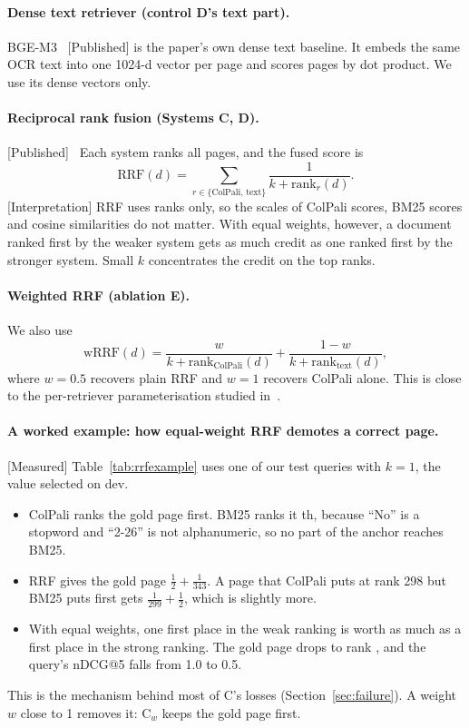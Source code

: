 \documentclass[11pt,a4paper]{article}
\newcommand{\lbl}[2]{\textsf{\scriptsize\textcolor{#1}{[#2]}}}
\newcommand{\Pub}{\lbl{tagP}{Published}}
\newcommand{\Int}{\lbl{tagI}{Interpretation}}
\newcommand{\Mea}{\lbl{tagM}{Measured}}
\begin{document}
\paragraph{Dense text retriever (control D's text part).} BGE-M3~\cite{colpali} \Pub{} is the paper's own dense text baseline. It embeds the same OCR text into one 1024-d vector per page and scores pages by dot product. We use its dense vectors only.

\paragraph{Reciprocal rank fusion (Systems C, D).} \Pub{}~\cite{cormack} Each system ranks all pages, and the fused score is
\begin{equation}
  \mathrm{RRF}(d) = \sum_{r \in \{\text{ColPali},\, \text{text}\}} \frac{1}{k + \mathrm{rank}_r(d)} .
\end{equation}
\Int{} RRF uses ranks only, so the scales of ColPali scores, BM25 scores and cosine similarities do not matter. With equal weights, however, a document ranked first by the weaker system gets as much credit as one ranked first by the stronger system. Small $k$ concentrates the credit on the top ranks.

\paragraph{Weighted RRF (ablation E).} We also use
\begin{equation}
  \mathrm{wRRF}(d) = \frac{w}{k + \mathrm{rank}_\text{ColPali}(d)} + \frac{1-w}{k + \mathrm{rank}_\text{text}(d)} ,
\end{equation}
where $w=0.5$ recovers plain RRF and $w=1$ recovers ColPali alone. This is close to the per-retriever parameterisation studied in~\cite{bruch}.

\paragraph{A worked example: how equal-weight RRF demotes a correct page.} \Mea{} Table~\ref{tab:rrfexample} uses one of our test queries with $k=1$, the value selected on dev.
\begin{itemize}
  \item ColPali ranks the gold page first. BM25 ranks it \exGoldA{}th, because ``No'' is a stopword and ``2-26'' is not alphanumeric, so no part of the anchor reaches BM25.
  \item RRF gives the gold page $\frac12 + \frac{1}{343}$. A page that ColPali puts at rank 298 but BM25 puts first gets $\frac{1}{299}+\frac12$, which is slightly more.
  \item With equal weights, one first place in the weak ranking is worth as much as a first place in the strong ranking. The gold page drops to rank \exGoldC{}, and the query's nDCG@5 falls from 1.0 to 0.5.
\end{itemize}
This is the mechanism behind most of C's losses (Section~\ref{sec:failure}). A weight $w$ close to 1 removes it: C$_w$ keeps the gold page first.
\end{document}
